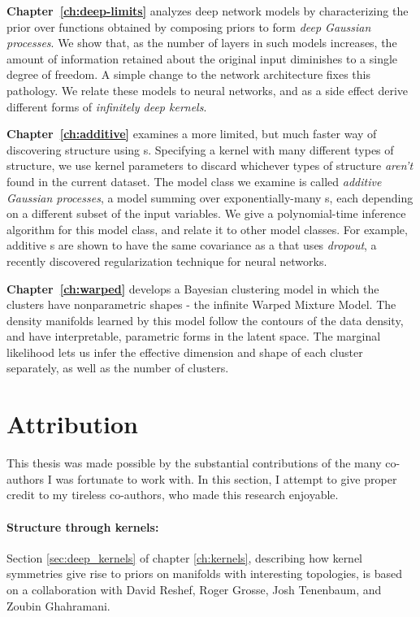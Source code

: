 {\bf Chapter~\ref{ch:deep-limits}} analyzes deep network models by characterizing the prior over functions obtained by composing \gp{} priors to form \emph{deep Gaussian processes}.
We show that, as the number of layers in such models increases, the amount of information retained about the original input diminishes to a single degree of freedom.
A simple change to the network architecture fixes this pathology.
We relate these models to neural networks, and as a side effect derive different forms of \emph{infinitely deep kernels}.

{\bf Chapter~\ref{ch:additive}} examines a more limited, but much faster way of discovering structure using \gp{}s.
Specifying a kernel with many different types of structure, we use kernel parameters to discard whichever types of structure \emph{aren't} found in the current dataset.
The model class we examine is called \emph{additive Gaussian processes}, a model summing over exponentially-many \gp{}s, each depending on a different subset of the input variables.
We give a polynomial-time inference algorithm for this model class, and relate it to other model classes.
For example, additive \gp{}s are shown to have the same covariance as a \gp{} that uses \emph{dropout}, a recently discovered regularization technique for neural networks.

{\bf Chapter~\ref{ch:warped}} develops a Bayesian clustering model in which the clusters have nonparametric shapes - the infinite Warped Mixture Model.
The density manifolds learned by this model follow the contours of the data density, and have interpretable, parametric forms in the latent space.
The marginal likelihood lets us infer the effective dimension and shape of each cluster separately, as well as the number of clusters.



\iffalse

\section{Attribution}

This thesis was made possible by the substantial contributions of the many co-authors I was fortunate to work with.
In this section, I attempt to give proper credit to my tireless co-authors, who made this research enjoyable.

\paragraph{Structure through kernels:}
Section \ref{sec:deep_kernels} of chapter \ref{ch:kernels}, describing how kernel symmetries give rise to priors on manifolds with interesting topologies, is based on a collaboration with David Reshef, Roger Grosse, Josh Tenenbaum, and Zoubin Ghahramani.

